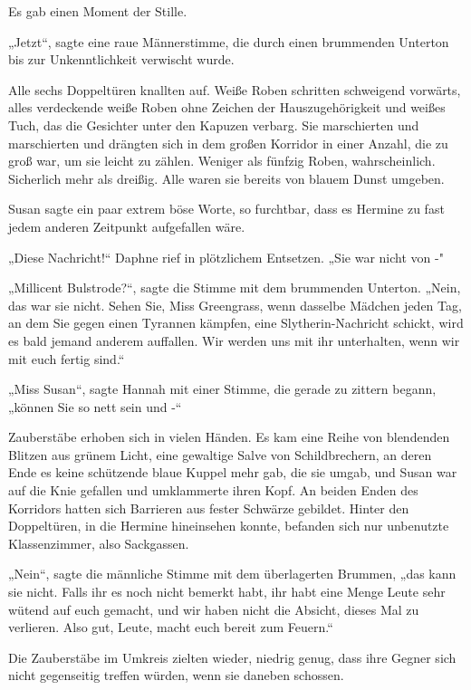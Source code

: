 {Es gab einen Moment der Stille.

„Jetzt“, sagte eine raue Männerstimme, die durch einen brummenden Unterton bis zur Unkenntlichkeit verwischt wurde.

Alle sechs Doppeltüren knallten auf. Weiße Roben schritten schweigend vorwärts, alles verdeckende weiße Roben ohne Zeichen der Hauszugehörigkeit und weißes Tuch, das die Gesichter unter den Kapuzen verbarg. Sie marschierten und marschierten und drängten sich in dem großen Korridor in einer Anzahl, die zu groß war, um sie leicht zu zählen. Weniger als fünfzig Roben, wahrscheinlich. Sicherlich mehr als dreißig. Alle waren sie bereits von blauem Dunst umgeben.

Susan sagte ein paar extrem böse Worte, so furchtbar, dass es Hermine zu fast jedem anderen Zeitpunkt aufgefallen wäre.

„Diese Nachricht!“ Daphne rief in plötzlichem Entsetzen. „Sie war nicht von -"

„Millicent Bulstrode?“, sagte die Stimme mit dem brummenden Unterton. „Nein, das war sie nicht. Sehen Sie, Miss Greengrass, wenn dasselbe Mädchen jeden Tag, an dem Sie gegen einen Tyrannen kämpfen, eine Slytherin-Nachricht schickt, wird es bald jemand anderem auffallen. Wir werden uns mit ihr unterhalten, wenn wir mit euch fertig sind.“

„Miss Susan“, sagte Hannah mit einer Stimme, die gerade zu zittern begann, „können Sie so nett sein und -“

Zauberstäbe erhoben sich in vielen Händen. Es kam eine Reihe von blendenden Blitzen aus grünem Licht, eine gewaltige Salve von Schildbrechern, an deren\\ Ende es keine schützende blaue Kuppel mehr gab, die sie umgab, und Susan war auf die Knie gefallen und umklammerte ihren Kopf. An beiden Enden des Korridors hatten sich Barrieren aus fester Schwärze gebildet. Hinter den Doppeltüren, in die Hermine hineinsehen konnte, befanden sich nur unbenutzte Klassenzimmer, also Sackgassen.

„Nein“, sagte die männliche Stimme mit dem überlagerten Brummen, „das kann sie nicht. Falls ihr es noch nicht bemerkt habt, ihr habt eine Menge Leute sehr wütend auf euch gemacht, und wir haben nicht die Absicht, dieses Mal zu verlieren. Also gut, Leute, macht euch bereit zum Feuern.“

Die Zauberstäbe im Umkreis zielten wieder, niedrig genug, dass ihre Gegner sich nicht gegenseitig treffen würden, wenn sie daneben schossen.

}
